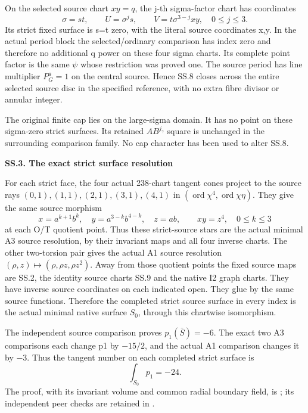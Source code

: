 On the selected source chart \(xy=q\), the j-th
sigma-factor chart has coordinates
\[
 \sigma=st,\qquad U=\sigma^j s,
 \qquad V=t\sigma^{3-j}xy,
 \quad0\le j\le3.
 \tag{SS.9}
\]
Its strict fixed surface is s=t zero, with the literal
source coordinates x,y. In the actual period block
the selected/ordinary comparison has index zero and
therefore no additional q power on these four sigma
charts. Its complete point factor is the same \(\psi\)
whose restriction was proved one. The source period has
line multiplier \(P_G^a=1\) on the central source.
Hence SS.8 closes across the entire selected source
disc in the specified reference, with no extra fibre
divisor or annular integer.

The original finite cap lies on the large-sigma domain.
It has no point on these sigma-zero strict surfaces.
Its retained \(AB^{j_\gamma}\) square is unchanged in
the surrounding comparison family. No cap character
has been used to alter SS.8.

\par

\medskip\noindent\textbf{SS.3. The exact strict surface resolution}

\par\nobreak

For each strict face, the four actual 238-chart tangent
cones project to the source rays
\((0,1),(1,1),(2,1),(3,1),(4,1)\) in
\((\operatorname{ord}\chi^4,\operatorname{ord}\chi\eta)\).
They give the same source morphism
\[
 x=a^{k+1}b^k,\quad y=a^{3-k}b^{4-k},\quad z=ab,
 \qquad xy=z^4,\quad0\le k\le3
 \tag{SS.10}
\]
at each O/T quotient point. Thus these strict-source
stars are the actual minimal A3 source resolution, by
their invariant maps and all four inverse charts.
The other two-torsion pair gives the actual A1 source
resolution \((\rho,z)\mapsto(\rho,\rho z,\rho z^2)\).
Away from those quotient points the fixed source maps
are SS.2, the identity source charts SS.9 and the native
I2 graph charts. They have inverse source coordinates
on each indicated open. They glue by the same source
functions. Therefore the completed strict source
surface in every index is the actual minimal native
surface \(S_0\), through this chartwise isomorphism.

The independent source comparison proves
\(p_1(\bar S)=-6\). The exact two A3 comparisons each
change p1 by \(-15/2\), and the actual A1 comparison
changes it by \(-3\). Thus the tangent number on each
completed strict surface is
\[
 \int_{S_0}p_1=-24.
 \tag{SS.11}
\]
The proof, with its invariant volume and common radial
boundary field, is
;
its independent peer checks are retained in
.

